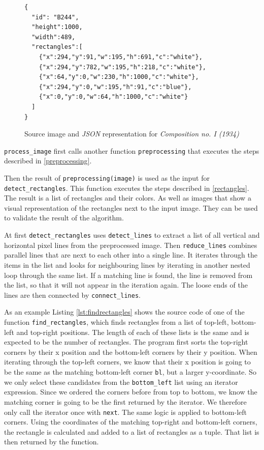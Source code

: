 \documentclass[serif,article,noparskip]{agse-thesis}
\begin{document}
\begin{figure}
\begin{minipage}{0.2\textwidth}
\end{minipage}
\begin{minipage}{0.8\textwidth}
\begin{lstlisting}
{
  "id": "B244",
  "height":1000,
  "width":489,
  "rectangles":[
    {"x":294,"y":91,"w":195,"h":691,"c":"white"},
    {"x":294,"y":782,"w":195,"h":218,"c":"white"},
    {"x":64,"y":0,"w":230,"h":1000,"c":"white"},
    {"x":294,"y":0,"w":195,"h":91,"c":"blue"},
    {"x":0,"y":0,"w":64,"h":1000,"c":"white"}
  ]
}
\end{lstlisting}
\end{minipage}
\caption{Source image and \textit{JSON} representation for \textit{Composition no. I (1934)}}
\label{fig:json}
\end{figure}


\texttt{process\_image} first calls another function \texttt{preprocessing} that
executes the steps described in \ref{preprocessing}.

Then the result of \texttt{preprocessing(image)} is used as the input for
\texttt{detect\_rectangles}. This function executes the steps described in
\ref{rectangles}. The result is a list of rectangles and their colors. As well
as images that show a visual representation of the rectangles next to the input
image. They can be used to validate the result of the algorithm.

At first \texttt{detect\_rectangles} uses \texttt{detect\_lines} to extract a
list of all vertical and horizontal pixel lines from the preprocessed image.
Then \texttt{reduce\_lines} combines parallel lines that are next to each other
into a single line. It iterates through the items in the list and looks for
neighbouring lines by iterating in another nested loop through the same list. If
a matching line is found, the line is removed from the list, so that it will not
appear in the iteration again. The loose ends of the lines are then connected by
\texttt{connect\_lines}.

As an example Listing \ref{lst:findrectangles} shows the source code of
one of the function \texttt{find\_rectangles}, which finds rectangles from a
list of top-left, bottom-left and top-right positions. The length of each of
these lists is the same and is expected to be the number of rectangles. The
program first sorts the top-right corners by their x position and the
bottom-left corners by their y position. When iterating through the top-left
corners, we know that their x position is going to be the same as the matching
bottom-left corner \texttt{bl}, but a larger y-coordinate. So we only select
these candidates from the \texttt{bottom\_left} list using an iterator
expression. Since we ordered the corners before from top to bottom, we know the
matching corner is going to be the first returned by the iterator. We therefore
only call the iterator once with \texttt{next}. The same logic is applied to
bottom-left corners. Using the coordinates of the matching top-right and
bottom-left corners, the rectangle is calculated and added to a list of
rectangles as a tuple. That list is then returned by the function.
\end{document}
